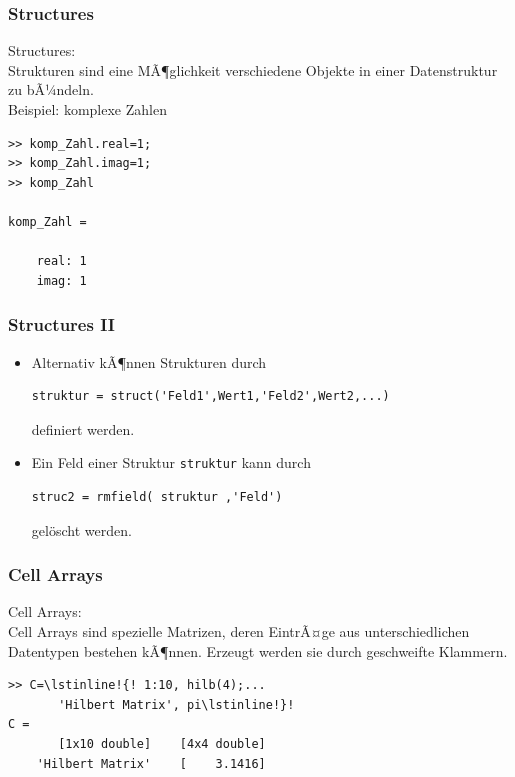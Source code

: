 %
%
\begin{frame}[fragile]\frametitle{Structures}
\alert{Structures:}\\
Strukturen sind eine MÃ¶glichkeit verschiedene Objekte in einer
Datenstruktur zu bÃ¼ndeln.\\[1cm]

\alert{Beispiel:} komplexe Zahlen
\begin{lstlisting}
>> komp_Zahl.real=1;
>> komp_Zahl.imag=1;
>> komp_Zahl

komp_Zahl = 

    real: 1
    imag: 1
\end{lstlisting}
\end{frame}
%
%
\begin{frame}[fragile]\frametitle{Structures II}
\begin{itemize}
\item Alternativ kÃ¶nnen Strukturen durch
\begin{lstlisting}
struktur = struct('Feld1',Wert1,'Feld2',Wert2,...)
\end{lstlisting}
definiert werden.
\item Ein Feld einer Struktur \lstinline!struktur! kann durch 
\begin{lstlisting}
struc2 = rmfield( struktur ,'Feld')
\end{lstlisting}
gel\"oscht werden. 
\end{itemize}
\end{frame}
%
%
\begin{frame}[fragile]\frametitle{Cell Arrays}
\alert{Cell Arrays:} \\
Cell Arrays sind spezielle Matrizen, deren  EintrÃ¤ge aus unterschiedlichen
Datentypen bestehen kÃ¶nnen. Erzeugt
werden sie durch geschweifte Klammern.\\
\begin{lstlisting}
>> C=\lstinline!{! 1:10, hilb(4);...
       'Hilbert Matrix', pi\lstinline!}!
C = 
       [1x10 double]    [4x4 double]
    'Hilbert Matrix'    [    3.1416]
\end{lstlisting} 
\end{frame}
%
%
